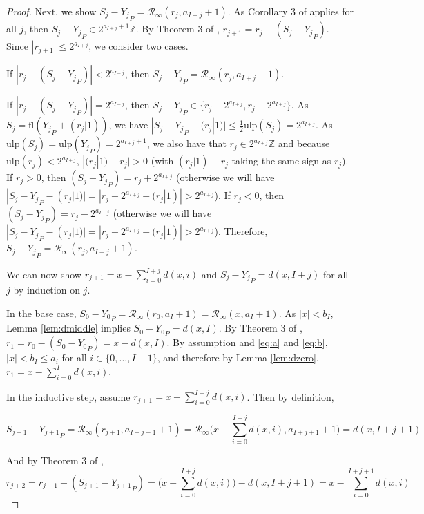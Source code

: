 \documentclass[12pt]{article}
\providecommand{\Z}{\ensuremath{\mathbb{Z}}}
\providecommand{\ulp}{\ensuremath{\text{ulp}}}
\providecommand{\fl}{\ensuremath{\text{fl}}}
\providecommand{\roundtonearestinfty}{\ensuremath{\mathcal{R}_\text{$\infty$}}}
\theoremstyle{definition}
\numberwithin{equation}{section}
\numberwithin{figure}{section}
\begin{document}
\begin{proof}
        Next, we show $S_j - {Y_j}_P = \roundtonearestinfty(r_j, a_{I + j} + 1)$. As Corollary 3 of \cite{repsum} applies for all $j$, then $S_j - {Y_j}_P \in 2^{a_{I + j} + 1}\Z$. By Theorem 3 of \cite{repsum}, $r_{j + 1} = r_j - (S_j - {Y_j}_P)$. Since $|r_{j + 1}| \leq 2^{a_{I + j}}$, we consider two cases.

        If $|r_j - (S_j - {Y_j}_P)| < 2^{a_{I + j}}$, then $S_j - {Y_j}_P = \roundtonearestinfty(r_j, a_{I + j} + 1)$.

        If $|r_j - (S_j - {Y_j}_P)| = 2^{a_{I + j}}$, then $S_j - {Y_j}_P \in \{r_j + 2^{a_{I + j}},  r_j - 2^{a_{I + j}}\}$.
        As $S_j = \fl({Y_j}_P + (r_j|1))$, we have $|S_j - {Y_j}_P - (r_j|1)| \leq \frac{1}{2}\ulp(S_j) = 2^{a_{I + j}}$.  As $\ulp(S_j) = \ulp({Y_j}_P) = 2^{a_{I + j} + 1}$, we also have that $r_j \in 2^{a_{I + j}}\Z$  and because $\ulp(r_j) < 2^{a_{I + j}}$, $|(r_j|1) - r_j| > 0$ (with $(r_j|1) - r_j$ taking the same sign as $r_j$).
        If $r_j > 0$, then $(S_j - {Y_j}_P) = r_j + 2^{a_{I + j}}$ (otherwise we will have $|S_j - {Y_j}_P - (r_j|1)| = |r_j - 2^{a_{I + j}} - (r_j|1)| > 2^{a_{I + j}}$).
        If $r_j < 0$, then $(S_j - {Y_j}_P) = r_j - 2^{a_{I + j}}$ (otherwise we will have $|S_j - {Y_j}_P - (r_j|1)| = |r_j + 2^{a_{I + j}} - (r_j|1)| > 2^{a_{I + j}}$). Therefore, $S_j - {Y_j}_P = \roundtonearestinfty(r_j, a_{I + j} + 1)$.

        We can now show $r_{j + 1} = x - \sum\limits_{i = 0}^{I + j}d(x, i)$ and $S_j - {Y_j}_P = d(x, I + j)$ for all $j$ by induction on $j$.

        In the base case, $S_0 - {Y_0}_P = \roundtonearestinfty(r_0, a_I + 1) = \roundtonearestinfty(x, a_I + 1)$. As $|x| < b_I$, Lemma \ref{lem:dmiddle} implies $S_0 - {Y_0}_P = d(x, I)$. By Theorem 3 of \cite{repsum}, $r_1 = r_0 - (S_0 - {Y_0}_P) = x - d(x,I)$. By assumption and  \eqref{eq:a} and \eqref{eq:b}, $|x| < b_I \leq a_{i}$ for all $i \in \{0, ..., I - 1\}$, and therefore by Lemma \ref{lem:dzero}, $r_1 = x - \sum\limits_{i = 0}^Id(x, i)$.

        In the inductive step, assume $r_{j + 1} = x - \sum\limits_{i = 0}^{I + j}d(x, i)$. Then by definition,

        \begin{equation*}
          S_{j + 1} - {Y_{j + 1}}_P = \roundtonearestinfty(r_{j + 1}, a_{I + j + 1} + 1) = \roundtonearestinfty\bigl(x - \sum\limits_{i = 0}^{I + j}d(x, i), a_{I + j + 1} + 1\bigr) = d(x, I + j + 1)
        \end{equation*}

        And by Theorem 3 of \cite{repsum},
        \begin{equation*}
          r_{j + 2} = r_{j + 1} - (S_{j + 1} - {Y_{j + 1}}_P) = \bigl(x - \sum\limits_{i = 0}^{I + j}d(x, i)\bigr) - d(x, I + j + 1) = x - \sum\limits_{i = 0}^{I + j + 1}d(x, i)
        \end{equation*}
      \end{proof}
\end{document}
